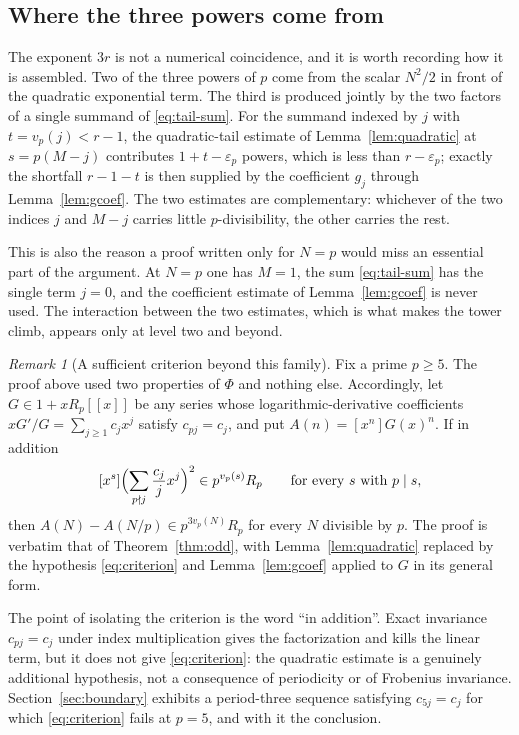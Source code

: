 \documentclass[11pt,a4paper]{article}
\numberwithin{equation}{section}
\theoremstyle{definition}
\theoremstyle{remark}
\newtheorem{remark}[theorem]{Remark}
\newcommand{\eps}{\varepsilon}
\begin{document}
\subsection{Where the three powers come from}
\label{sec:three-powers}
The exponent $3r$ is not a numerical coincidence, and it is worth recording
how it is assembled. Two of the three powers of $p$ come from the scalar
$N^2/2$ in front of the quadratic exponential term. The third is produced
jointly by the two factors of a single summand of \eqref{eq:tail-sum}. For
the summand indexed by $j$ with $t=v_p(j)<r-1$, the quadratic-tail estimate
of Lemma~\ref{lem:quadratic} at $s=p(M-j)$ contributes $1+t-\eps_p$ powers,
which is less than $r-\eps_p$; exactly the shortfall $r-1-t$ is then
supplied by the coefficient $g_j$ through Lemma~\ref{lem:gcoef}. The two
estimates are complementary: whichever of the two indices $j$ and $M-j$
carries little $p$-divisibility, the other carries the rest.

This is also the reason a proof written only for $N=p$ would miss an
essential part of the argument. At $N=p$ one has $M=1$, the sum
\eqref{eq:tail-sum} has the single term $j=0$, and the coefficient estimate
of Lemma~\ref{lem:gcoef} is never used. The interaction between the two
estimates, which is what makes the tower climb, appears only at level two
and beyond.

\begin{remark}[A sufficient criterion beyond this family]
\label{rem:criterion}
Fix a prime $p\ge5$. The proof above used two properties of $\Phi$ and
nothing else. Accordingly, let $G\in1+xR_p[[x]]$ be any series whose
logarithmic-derivative coefficients $xG'/G=\sum_{j\ge1}c_jx^j$ satisfy
$c_{pj}=c_j$, and put $A(n)=[x^n]G(x)^n$. If in addition
\begin{equation}\label{eq:criterion}
 [x^s]\Bigl(\sum_{p\nmid j}\frac{c_j}{j}x^j\Bigr)^2
 \in p^{v_p(s)}R_p
 \qquad\text{for every }s\text{ with }p\mid s,
\end{equation}
then $A(N)-A(N/p)\in p^{3v_p(N)}R_p$ for every $N$ divisible by $p$.
The proof is verbatim that of Theorem~\ref{thm:odd}, with
Lemma~\ref{lem:quadratic} replaced by the hypothesis \eqref{eq:criterion}
and Lemma~\ref{lem:gcoef} applied to $G$ in its general form.

The point of isolating the criterion is the word ``in addition''. Exact
invariance $c_{pj}=c_j$ under index multiplication gives the factorization
and kills the linear term, but it does not give \eqref{eq:criterion}:
the quadratic estimate is a genuinely additional hypothesis, not a
consequence of periodicity or of Frobenius invariance.
Section~\ref{sec:boundary} exhibits a period-three sequence satisfying
$c_{5j}=c_j$ for which \eqref{eq:criterion} fails at $p=5$, and with it the
conclusion.
\end{remark}
\end{document}
